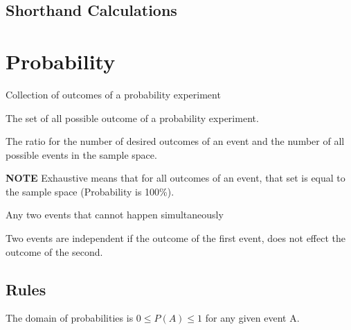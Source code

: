 \documentclass[11pt]{article}
\begin{document}


\subsection{Shorthand Calculations}


\section{Probability}

\begin{definition}[Event]\label{def:event}
    Collection of outcomes of a probability experiment
\end{definition}

\begin{definition}\label{def:sample-space}
    The set of all possible outcome of a probability experiment.
\end{definition}

\begin{definition}\label{def:Classical Probability}
    The ratio for the number of desired outcomes of an event
    and the number of all possible events in the sample space.
\end{definition}

\textbf{NOTE} Exhaustive means that for all outcomes of an event, that set is equal to the sample space (Probability is 100\%).

\begin{definition}\label{def:mutually-exclusive}
    Any two events that cannot happen simultaneously
\end{definition}

\begin{definition}\label{def:independent-events}
    Two events are independent if the outcome of the first event,
    does not effect the outcome of the second.
\end{definition}

\subsection{Rules}

The domain of probabilities is $0 \leq P(A) \leq 1$ for any given event A.
\end{document}
